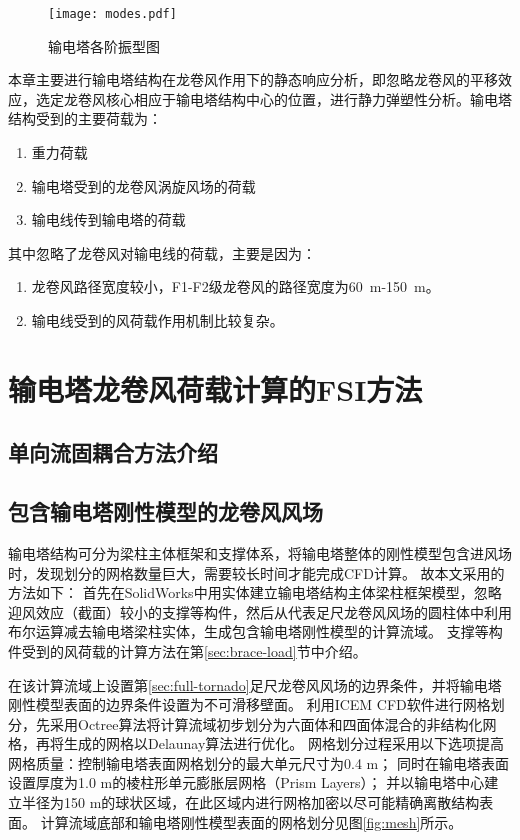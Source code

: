 \begin{figure}[!htbp]
	\centering
	\texttt{[image: modes.pdf]}
	\caption{输电塔各阶振型图}
	\label{fig:modes}
\end{figure}

本章主要进行输电塔结构在龙卷风作用下的静态响应分析，即忽略龙卷风的平移效应，选定龙卷风核心相应于输电塔结构中心的位置，进行静力弹塑性分析。输电塔结构受到的主要荷载为：
\begin{enumerate}
	\item 重力荷载
	\item 输电塔受到的龙卷风涡旋风场的荷载
	\item 输电线传到输电塔的荷载
\end{enumerate}
其中忽略了龙卷风对输电线的荷载，主要是因为：
\begin{enumerate}
	\item 龙卷风路径宽度较小，F1-F2级龙卷风的路径宽度为\SI{60}{m}-\SI{150}{m}。
	\item 输电线受到的风荷载作用机制比较复杂。
\end{enumerate}

\section{输电塔龙卷风荷载计算的FSI方法}

\subsection{单向流固耦合方法介绍}

\subsection{包含输电塔刚性模型的龙卷风风场}\label{sec:tornado-fsi}
输电塔结构可分为梁柱主体框架和支撑体系，将输电塔整体的刚性模型包含进风场时，发现划分的网格数量巨大，需要较长时间才能完成CFD计算。
故本文采用的方法如下：
首先在SolidWorks中用实体建立输电塔结构主体梁柱框架模型，忽略迎风效应（截面）较小的支撑等构件，然后从代表足尺龙卷风风场的圆柱体中利用布尔运算减去输电塔梁柱实体，生成包含输电塔刚性模型的计算流域。
支撑等构件受到的风荷载的计算方法在第\ref{sec:brace-load}节中介绍。

在该计算流域上设置第\ref{sec:full-tornado}足尺龙卷风风场的边界条件，并将输电塔刚性模型表面的边界条件设置为不可滑移壁面。
利用ICEM CFD软件进行网格划分，先采用Octree算法将计算流域初步划分为六面体和四面体混合的非结构化网格，再将生成的网格以Delaunay算法进行优化。
网格划分过程采用以下选项提高网格质量：控制输电塔表面网格划分的最大单元尺寸为0.4 m；
同时在输电塔表面设置厚度为1.0 m的棱柱形单元膨胀层网格（Prism Layers）；
并以输电塔中心建立半径为150 m的球状区域，在此区域内进行网格加密以尽可能精确离散结构表面。
计算流域底部和输电塔刚性模型表面的网格划分见图\ref{fig:mesh}所示。

